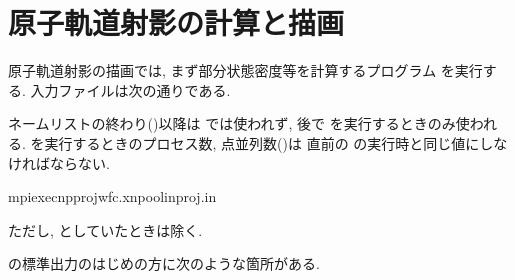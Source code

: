 \documentclass[letterpaper,10pt,dvipdfmx,openany]{sphinxmanual}
\begin{document}
\section{原子軌道射影の計算と描画}
\label{\detokenize{qe:id1}}
\sphinxAtStartPar
原子軌道射影の描画では, まず部分状態密度等を計算するプログラム
 を実行する.
入力ファイルは次の通りである.

\sphinxAtStartPar
{}

\begin{sphinxVerbatim}[commandchars=\\\{\}]
     
 
\end{sphinxVerbatim}

\sphinxAtStartPar
{} ネームリストの終わり(\sphinxcode{\sphinxupquote{/}})以降は  では使われず,
後で  を実行するときのみ使われる.
 を実行するときのプロセス数,  点並列数()は
直前の  の実行時と同じ値にしなければならない.

\begin{sphinxVerbatim}[commandchars=\\\{\}]
\PYGZdl{}mpiexec\PYGZhy{}npprojwfc.x\PYGZhy{}npool\PYGZhy{}inproj.in
\end{sphinxVerbatim}

\sphinxAtStartPar
ただし,  としていたときは除く.

\sphinxAtStartPar
{} の標準出力のはじめの方に次のような箇所がある.
\end{document}

